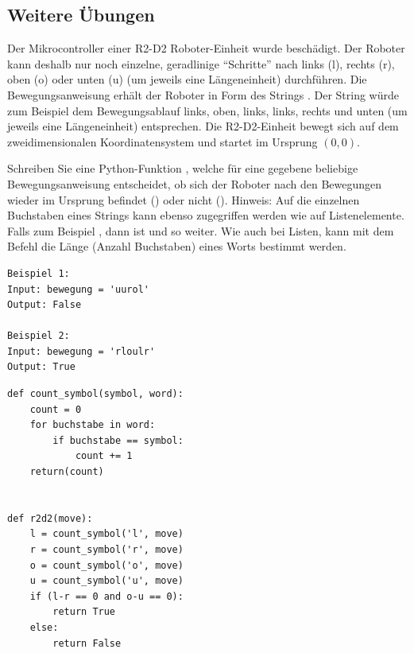 \subsection{Weitere Übungen}

\begin{mychallenge}

Der Mikrocontroller einer R2-D2 Roboter-Einheit wurde beschädigt. Der Roboter kann deshalb nur noch einzelne, geradlinige \enquote{Schritte} nach links (l), rechts (r), oben (o) oder unten (u) (um jeweils eine Längeneinheit) durchführen. Die Bewegungsanweisung erhält der Roboter in Form des Strings . Der String  würde zum Beispiel dem Bewegungsablauf links, oben, links, links, rechts und unten (um jeweils eine Längeneinheit) entsprechen. Die R2-D2-Einheit bewegt sich auf dem zweidimensionalen Koordinatensystem und startet im Ursprung $(0,0)$.


Schreiben Sie eine Python-Funktion , welche für eine gegebene beliebige Be\-we\-gungs\-an\-wei\-sung  entscheidet, ob sich der Roboter nach den Bewegungen wieder im Ursprung befindet () oder nicht (). Hinweis: Auf die einzelnen Buchstaben eines Strings kann ebenso zugegriffen werden wie auf Listenelemente. Falls zum Beispiel , dann ist  und so weiter. Wie auch bei Listen, kann mit dem Befehl  die Länge (Anzahl Buchstaben) eines Worts bestimmt werden.

\begin{lstlisting}[numbers=none,framexleftmargin=0em,xleftmargin=0em]
Beispiel 1:
Input: bewegung = 'uurol'
Output: False

Beispiel 2:
Input: bewegung = 'rloulr'
Output: True
\end{lstlisting}

\begin{myanswer}
\begin{lstlisting}
def count_symbol(symbol, word):
    count = 0
    for buchstabe in word:
        if buchstabe == symbol:
            count += 1
    return(count)


def r2d2(move):
    l = count_symbol('l', move)
    r = count_symbol('r', move)
    o = count_symbol('o', move)
    u = count_symbol('u', move)
    if (l-r == 0 and o-u == 0):
        return True
    else:
        return False
\end{lstlisting}
\end{myanswer}
\end{mychallenge}